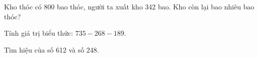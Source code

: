\begin{ex}
Kho thóc có 800 bao thóc, người ta xuất kho 342 bao. Kho còn lại bao nhiêu bao thóc?
\end{ex}

\begin{ex}
Tính giá trị biểu thức: $735 - 268 - 189$.
\end{ex}

\begin{ex}
Tìm hiệu của số 612 và số 248.
\end{ex}
